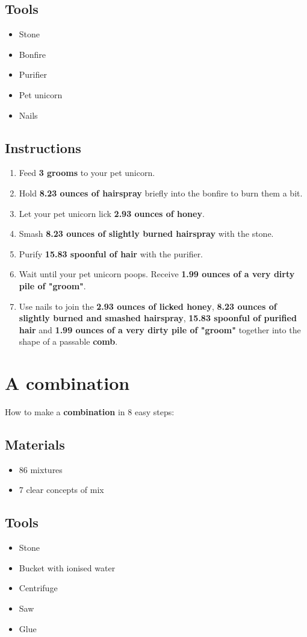 \documentclass{article}
\begin{document}
\subsection{Tools}\begin{itemize}
\item 
Stone
\item 
Bonfire
\item 
Purifier
\item 
Pet unicorn
\item 
Nails
\end{itemize}
\subsection{Instructions}\begin{enumerate}
\item 
Feed \textbf{3 grooms} to your pet unicorn.
\item 
Hold \textbf{8.23 ounces of hairspray} briefly into the bonfire to burn them a bit.
\item 
Let your pet unicorn lick \textbf{2.93 ounces of honey}.
\item 
Smash \textbf{8.23 ounces of slightly burned hairspray} with the stone.
\item 
Purify \textbf{15.83 spoonful of hair} with the purifier.
\item 
Wait until your pet unicorn poops. Receive \textbf{1.99 ounces of a very dirty pile of "groom"}.
\item 
Use nails to join the \textbf{2.93 ounces of licked honey}, \textbf{8.23 ounces of slightly burned and smashed hairspray}, \textbf{15.83 spoonful of purified hair} and \textbf{1.99 ounces of a very dirty pile of "groom"} together into the shape of a passable \textbf{comb}.
\end{enumerate}
\newpage
\section{A combination}How to make a \textbf{combination} in 8 easy steps:

\subsection{Materials}\begin{itemize}
\item 
86 mixtures
\item 
7 clear concepts of mix
\end{itemize}
\subsection{Tools}\begin{itemize}
\item 
Stone
\item 
Bucket with ionised water
\item 
Centrifuge
\item 
Saw
\item 
Glue
\end{itemize}
\end{document}
